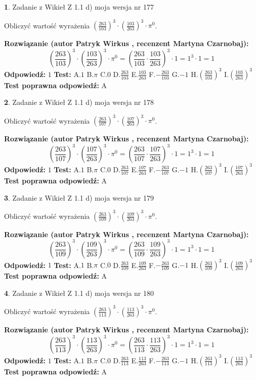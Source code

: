 \documentclass[12pt, a4paper]{article}
\theoremstyle{definition} %
\newtheorem{zad}{}
\newcommand{\zadStart}[1]{\begin{zad}#1\newline}
\newcommand{\zadStop}{\end{zad}}
\newcommand{\rozwStart}[2]{\noindent \textbf{Rozwiązanie (autor #1 , recenzent #2): }\newline}
\newcommand{\rozwStop}{\newline}
\newcommand{\odpStart}{\noindent \textbf{Odpowiedź:}\newline}
\newcommand{\odpStop}{\newline}
\newcommand{\testStart}{\noindent \textbf{Test:}\newline}
\newcommand{\testStop}{\newline}
\newcommand{\kluczStart}{\noindent \textbf{Test poprawna odpowiedź:}\newline}
\newcommand{\kluczStop}{\newline}
\begin{document}
\zadStart{Zadanie z Wikieł Z 1.1 d) moja wersja nr 177}

Obliczyć wartość wyrażenia $(\frac{263}{103})^{3} \cdot (\frac{103}{263})^{3} \cdot \pi^{0}$.
\zadStop
\rozwStart{Patryk Wirkus}{Martyna Czarnobaj}
$$(\frac{263}{103})^{3} \cdot (\frac{103}{263})^{3} \cdot \pi^{0} = (\frac{263}{103} \cdot \frac{103}{263})^{3} \cdot 1 = 1^{3} \cdot 1 = 1$$
\rozwStop
\odpStart
$1$
\odpStop
\testStart
A.$1$ B.$\pi$ C.$0$ D.$\frac{263}{103}$ E.$\frac{103}{263}$
F.$-\frac{263}{103}$ G.$-1$
H.$(\frac{263}{103})^{3}$
I.$(\frac{103}{263})^{3}$
\testStop
\kluczStart
A
\kluczStop



\zadStart{Zadanie z Wikieł Z 1.1 d) moja wersja nr 178}

Obliczyć wartość wyrażenia $(\frac{263}{107})^{3} \cdot (\frac{107}{263})^{3} \cdot \pi^{0}$.
\zadStop
\rozwStart{Patryk Wirkus}{Martyna Czarnobaj}
$$(\frac{263}{107})^{3} \cdot (\frac{107}{263})^{3} \cdot \pi^{0} = (\frac{263}{107} \cdot \frac{107}{263})^{3} \cdot 1 = 1^{3} \cdot 1 = 1$$
\rozwStop
\odpStart
$1$
\odpStop
\testStart
A.$1$ B.$\pi$ C.$0$ D.$\frac{263}{107}$ E.$\frac{107}{263}$
F.$-\frac{263}{107}$ G.$-1$
H.$(\frac{263}{107})^{3}$
I.$(\frac{107}{263})^{3}$
\testStop
\kluczStart
A
\kluczStop



\zadStart{Zadanie z Wikieł Z 1.1 d) moja wersja nr 179}

Obliczyć wartość wyrażenia $(\frac{263}{109})^{3} \cdot (\frac{109}{263})^{3} \cdot \pi^{0}$.
\zadStop
\rozwStart{Patryk Wirkus}{Martyna Czarnobaj}
$$(\frac{263}{109})^{3} \cdot (\frac{109}{263})^{3} \cdot \pi^{0} = (\frac{263}{109} \cdot \frac{109}{263})^{3} \cdot 1 = 1^{3} \cdot 1 = 1$$
\rozwStop
\odpStart
$1$
\odpStop
\testStart
A.$1$ B.$\pi$ C.$0$ D.$\frac{263}{109}$ E.$\frac{109}{263}$
F.$-\frac{263}{109}$ G.$-1$
H.$(\frac{263}{109})^{3}$
I.$(\frac{109}{263})^{3}$
\testStop
\kluczStart
A
\kluczStop



\zadStart{Zadanie z Wikieł Z 1.1 d) moja wersja nr 180}

Obliczyć wartość wyrażenia $(\frac{263}{113})^{3} \cdot (\frac{113}{263})^{3} \cdot \pi^{0}$.
\zadStop
\rozwStart{Patryk Wirkus}{Martyna Czarnobaj}
$$(\frac{263}{113})^{3} \cdot (\frac{113}{263})^{3} \cdot \pi^{0} = (\frac{263}{113} \cdot \frac{113}{263})^{3} \cdot 1 = 1^{3} \cdot 1 = 1$$
\rozwStop
\odpStart
$1$
\odpStop
\testStart
A.$1$ B.$\pi$ C.$0$ D.$\frac{263}{113}$ E.$\frac{113}{263}$
F.$-\frac{263}{113}$ G.$-1$
H.$(\frac{263}{113})^{3}$
I.$(\frac{113}{263})^{3}$
\testStop
\kluczStart
A
\kluczStop
\end{document}

